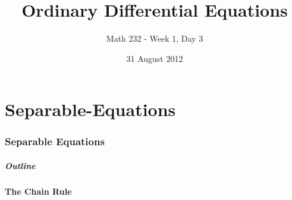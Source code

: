 \part{Separable-Equations}
\section{Separable Equations}


\title{Ordinary Differential Equations}
\subtitle{Math 232 - Week 1, Day 3}
\date{31 August 2012}

\begin{frame}
  \titlepage
\end{frame}

\begin{frame}
  \frametitle{Outline}
\end{frame}


\subsection{The Chain Rule}


